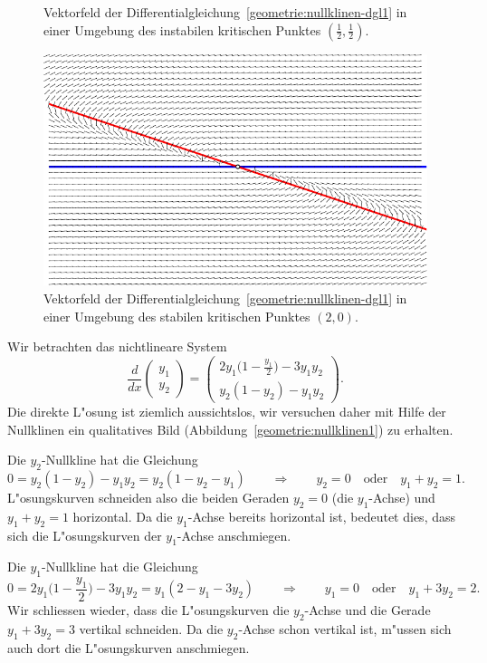 \begin{beispiel}
\begin{figure}
\caption{Vektorfeld der Differentialgleichung~\eqref{geometrie:nullklinen-dgl1}
in einer Umgebung des instabilen kritischen Punktes $(\frac12,\frac12)$.
\label{geometrie:nullklinen-instabil}}
\end{figure}
\begin{figure}
\centering
\includegraphics{chapters/images/nullklinen-4.pdf}
\caption{Vektorfeld der Differentialgleichung~\eqref{geometrie:nullklinen-dgl1}
in einer Umgebung des stabilen kritischen Punktes $(2,0)$.
\label{geometrie:nullklinen-stabil}}
\end{figure}
Wir betrachten das nichtlineare System 
\begin{equation}
\frac{d}{dx} \begin{pmatrix}y_1\\y_2\end{pmatrix}
=
\begin{pmatrix}
2y_1\biggl(1-\displaystyle\frac{y_1}2\biggr)-3y_1y_2\\
y_2(1-y_2)-y_1y_2
\end{pmatrix}.
\label{geometrie:nullklinen-dgl1}
\end{equation}
Die direkte L"osung ist ziemlich aussichtslos, wir versuchen daher mit
Hilfe der Nullklinen ein qualitatives Bild
(Abbildung~\ref{geometrie:nullklinen1}) zu erhalten.

Die $y_2$-Nullkline hat die Gleichung
\[
0=y_2(1-y_2)-y_1y_2=y_2(1-y_2-y_1)
\qquad\Rightarrow\qquad
y_2=0
\quad\text{oder}\quad
y_1+y_2=1.
\]
L"osungskurven schneiden also die beiden Geraden $y_2=0$ (die $y_1$-Achse)
und $y_1+y_2=1$ horizontal.
Da die $y_1$-Achse bereits horizontal ist, bedeutet dies, dass sich die
L"osungskurven der $y_1$-Achse anschmiegen.

Die $y_1$-Nullkline hat die Gleichung
\[
0=2y_1\biggl(1-\frac{y_1}2\biggr)-3y_1y_2=y_1(2-y_1-3y_2)
\qquad\Rightarrow\qquad
y_1=0
\quad\text{oder}\quad
y_1+3y_2=2.
\]
Wir schliessen wieder, dass die L"osungskurven die $y_2$-Achse und
die Gerade $y_1+3y_2=3$ vertikal schneiden.
Da die $y_2$-Achse schon vertikal ist, m"ussen sich auch dort
die L"osungskurven anschmiegen.


\end{beispiel}
